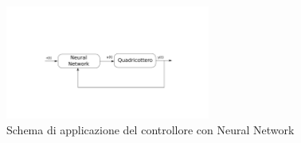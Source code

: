 \begin{figure}
	\centering
	\includegraphics[width=0.6\textwidth]{SistemaQuadrirotore/Figure/NN}
	\caption{Schema di applicazione del controllore con Neural Network}
\end{figure}
